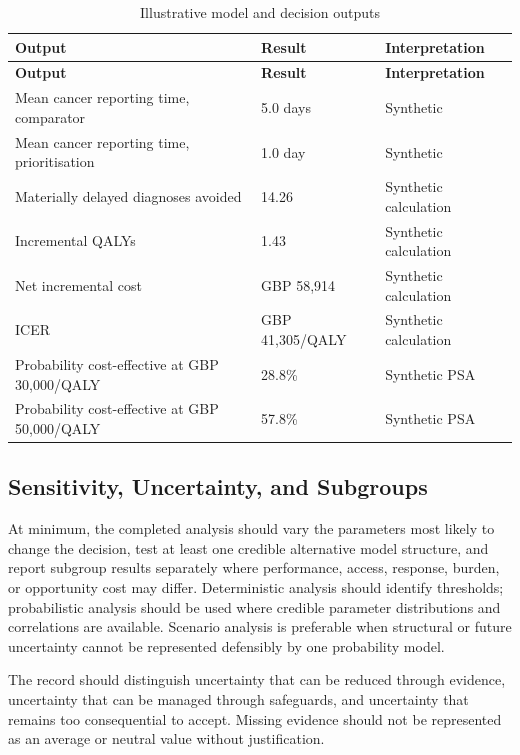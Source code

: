 \begin{longtable}{@{}p{}p{}p{}@{}}
\caption{Illustrative model and decision outputs}
\label{tab:comp-ch08-outputs}\\
\toprule
\textbf{Output} & \textbf{Result} & \textbf{Interpretation} \\
\midrule
\endfirsthead
\toprule
\textbf{Output} & \textbf{Result} & \textbf{Interpretation} \\
\midrule
\endhead
\bottomrule
\endlastfoot
Mean cancer reporting time, comparator & 5.0 days & Synthetic \\
Mean cancer reporting time, prioritisation & 1.0 day & Synthetic \\
Materially delayed diagnoses avoided & 14.26 & Synthetic calculation \\
Incremental QALYs & 1.43 & Synthetic calculation \\
Net incremental cost & GBP 58,914 & Synthetic calculation \\
ICER & GBP 41,305/QALY & Synthetic calculation \\
Probability cost-effective at GBP 30,000/QALY & 28.8\% & Synthetic PSA \\
Probability cost-effective at GBP 50,000/QALY & 57.8\% & Synthetic PSA \\
\end{longtable}

\subsection{Sensitivity, Uncertainty, and Subgroups}
At minimum, the completed analysis should vary the parameters most likely to
change the decision, test at least one credible alternative model structure, and
report subgroup results separately where performance, access, response, burden,
or opportunity cost may differ. Deterministic analysis should identify thresholds;
probabilistic analysis should be used where credible parameter distributions and
correlations are available. Scenario analysis is preferable when structural or
future uncertainty cannot be represented defensibly by one probability model.

The record should distinguish uncertainty that can be reduced through evidence,
uncertainty that can be managed through safeguards, and uncertainty that remains
too consequential to accept. Missing evidence should not be represented as an
average or neutral value without justification.

